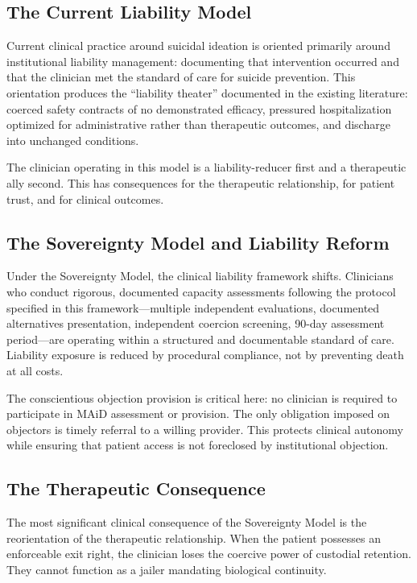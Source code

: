 \documentclass[11pt, letterpaper]{article}
\begin{document}
\subsection{The Current Liability Model}

Current clinical practice around suicidal ideation is oriented primarily around
institutional liability management: documenting that intervention occurred and that the
clinician met the standard of care for suicide prevention. This orientation produces
the ``liability theater'' documented in the existing literature: coerced safety
contracts of no demonstrated efficacy, pressured hospitalization optimized for
administrative rather than therapeutic outcomes, and discharge into unchanged conditions.

The clinician operating in this model is a liability-reducer first and a therapeutic
ally second. This has consequences for the therapeutic relationship, for patient trust,
and for clinical outcomes.

\subsection{The Sovereignty Model and Liability Reform}

Under the Sovereignty Model, the clinical liability framework shifts. Clinicians who
conduct rigorous, documented capacity assessments following the protocol specified in
this framework---multiple independent evaluations, documented alternatives presentation,
independent coercion screening, 90-day assessment period---are operating within a
structured and documentable standard of care. Liability exposure is reduced by
procedural compliance, not by preventing death at all costs.

The conscientious objection provision is critical here: no clinician is required to
participate in MAiD assessment or provision. The only obligation imposed on objectors
is timely referral to a willing provider. This protects clinical autonomy while
ensuring that patient access is not foreclosed by institutional objection.

\subsection{The Therapeutic Consequence}

The most significant clinical consequence of the Sovereignty Model is the reorientation
of the therapeutic relationship. When the patient possesses an enforceable exit right,
the clinician loses the coercive power of custodial retention. They cannot function as
a jailer mandating biological continuity.
\end{document}
